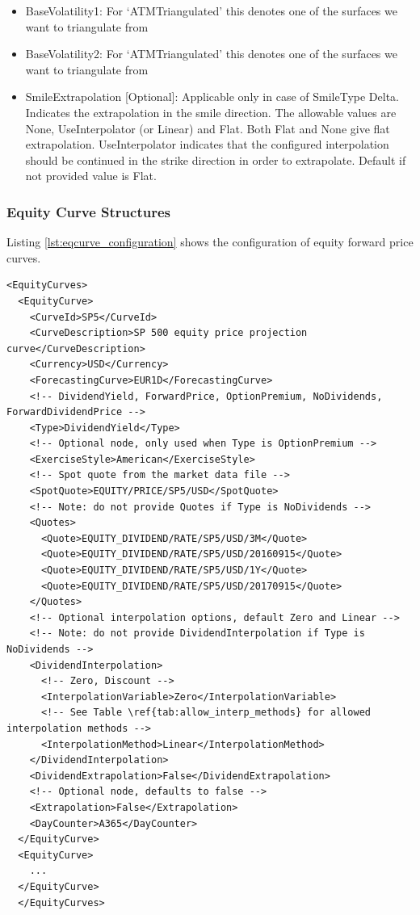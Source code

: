 \begin{itemize}
  data input. See \ref{sss:fx_option_conv} for more details.
\item BaseVolatility1: For `ATMTriangulated' this denotes one of the surfaces we want to triangulate from
\item BaseVolatility2: For `ATMTriangulated' this denotes one of the surfaces we want to triangulate from
\item SmileExtrapolation [Optional]: Applicable only in case of SmileType Delta. Indicates the extrapolation in the
smile direction. The allowable values are None, UseInterpolator (or Linear) and Flat. Both Flat and None give flat
extrapolation. UseInterpolator indicates that the configured interpolation should be continued in the strike
direction in order to extrapolate. Default if not provided value is Flat.

\end{itemize}

\subsubsection{Equity Curve Structures}

Listing \ref{lst:eqcurve_configuration} shows the configuration of equity forward price curves.

\begin{longlisting}
\begin{verbatim}
<EquityCurves>
  <EquityCurve>
    <CurveId>SP5</CurveId>
    <CurveDescription>SP 500 equity price projection curve</CurveDescription>
    <Currency>USD</Currency>
    <ForecastingCurve>EUR1D</ForecastingCurve>
    <!-- DividendYield, ForwardPrice, OptionPremium, NoDividends, ForwardDividendPrice -->
    <Type>DividendYield</Type>
    <!-- Optional node, only used when Type is OptionPremium -->
    <ExerciseStyle>American</ExerciseStyle>
    <!-- Spot quote from the market data file -->
    <SpotQuote>EQUITY/PRICE/SP5/USD</SpotQuote>
    <!-- Note: do not provide Quotes if Type is NoDividends -->
    <Quotes>
      <Quote>EQUITY_DIVIDEND/RATE/SP5/USD/3M</Quote>
      <Quote>EQUITY_DIVIDEND/RATE/SP5/USD/20160915</Quote>
      <Quote>EQUITY_DIVIDEND/RATE/SP5/USD/1Y</Quote>
      <Quote>EQUITY_DIVIDEND/RATE/SP5/USD/20170915</Quote>
    </Quotes>
    <!-- Optional interpolation options, default Zero and Linear -->
    <!-- Note: do not provide DividendInterpolation if Type is NoDividends -->
    <DividendInterpolation>
      <!-- Zero, Discount -->
      <InterpolationVariable>Zero</InterpolationVariable>
      <!-- See Table \ref{tab:allow_interp_methods} for allowed interpolation methods -->
      <InterpolationMethod>Linear</InterpolationMethod>
    </DividendInterpolation>
    <DividendExtrapolation>False</DividendExtrapolation>
    <!-- Optional node, defaults to false -->
    <Extrapolation>False</Extrapolation>
    <DayCounter>A365</DayCounter>
  </EquityCurve>
  <EquityCurve>
    ...
  </EquityCurve>
  </EquityCurves>
\end{verbatim}
\caption{Equity curve configuration}
\label{lst:eqcurve_configuration}
\end{longlisting}


